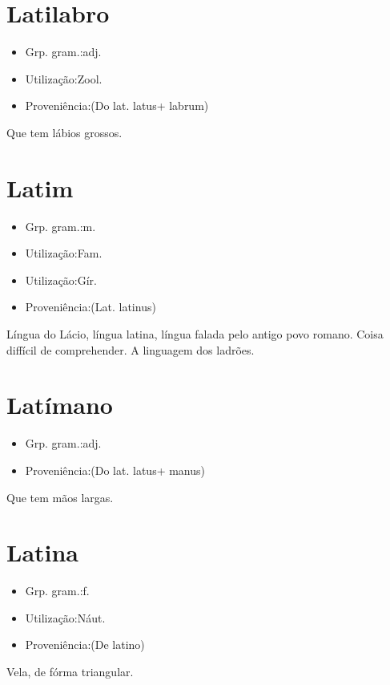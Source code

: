 \section{Latilabro}
\begin{itemize}
\item {Grp. gram.:adj.}
\end{itemize}
\begin{itemize}
\item {Utilização:Zool.}
\end{itemize}
\begin{itemize}
\item {Proveniência:(Do lat. \textunderscore latus\textunderscore  + \textunderscore labrum\textunderscore )}
\end{itemize}
Que tem lábios grossos.
\section{Latim}
\begin{itemize}
\item {Grp. gram.:m.}
\end{itemize}
\begin{itemize}
\item {Utilização:Fam.}
\end{itemize}
\begin{itemize}
\item {Utilização:Gír.}
\end{itemize}
\begin{itemize}
\item {Proveniência:(Lat. \textunderscore latinus\textunderscore )}
\end{itemize}
Língua do Lácio, língua latina, língua falada pelo antigo povo romano.
Coisa diffícil de comprehender.
A linguagem dos ladrões.
\section{Latímano}
\begin{itemize}
\item {Grp. gram.:adj.}
\end{itemize}
\begin{itemize}
\item {Proveniência:(Do lat. \textunderscore latus\textunderscore  + \textunderscore manus\textunderscore )}
\end{itemize}
Que tem mãos largas.
\section{Latina}
\begin{itemize}
\item {Grp. gram.:f.}
\end{itemize}
\begin{itemize}
\item {Utilização:Náut.}
\end{itemize}
\begin{itemize}
\item {Proveniência:(De \textunderscore latino\textunderscore )}
\end{itemize}
Vela, de fórma triangular.
